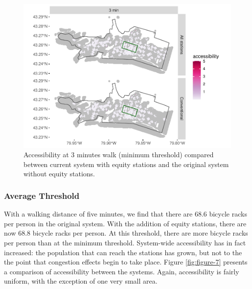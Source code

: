 \documentclass[]{elsarticle} %
\begin{document}
\begin{figure}

{\centering \includegraphics[width=0.9\linewidth]{Bike-share-spatial-equity_files/figure-latex/figure-6-1} 

}

\caption{Accessibility at 3 minutes walk (minimum threshold) compared between current system with equity stations and the original system without equity stations.}\label{fig:figure-6}
\end{figure}

\hypertarget{average-threshold}{%
\subsubsection{Average Threshold}\label{average-threshold}}

With a walking distance of five minutes, we find that there are 68.6
bicycle racks per person in the original system. With the addition of
equity stations, there are now 68.8 bicycle racks per person. At this
threshold, there are more bicycle racks per person than at the minimum
threshold. System-wide accessibility has in fact increased: the
population that can reach the stations has grown, but not to the the
point that congestion effects begin to take place. Figure
\ref{fig:figure-7} presents a comparison of accessibility between the
systems. Again, accessibility is fairly uniform, with the exception of
one very small area.
\end{document}
